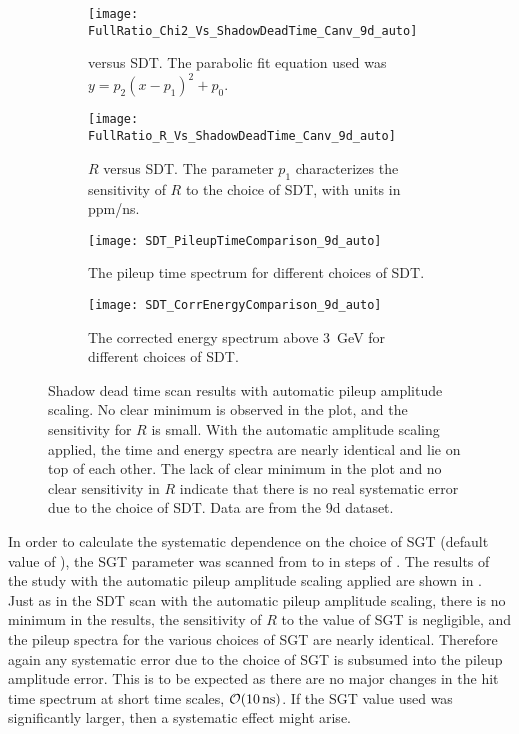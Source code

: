 \begin{figure}
\centering
    \begin{subfigure}[t]{0.45\textwidth}
        \centering
        \texttt{[image: FullRatio\_Chi2\_Vs\_ShadowDeadTime\_Canv\_9d\_auto]}
        \caption{\chisq versus SDT. The parabolic fit equation used was $y = p_{2}(x - p_{1})^{2} + p_{0}.$}
    \end{subfigure}%
    \hspace{1cm}
    \begin{subfigure}[t]{0.45\textwidth}
        \centering
        \texttt{[image: FullRatio\_R\_Vs\_ShadowDeadTime\_Canv\_9d\_auto]}
        \caption{$R$ versus SDT. The parameter $p_{1}$ characterizes the sensitivity of $R$ to the choice of SDT, with units in ppm/ns.}
    \end{subfigure}

    \begin{subfigure}[t]{0.45\textwidth}
        \centering
        \texttt{[image: SDT\_PileupTimeComparison\_9d\_auto]}
        \caption{The pileup time spectrum for different choices of SDT.}
    \end{subfigure}%
    \hspace{1cm}
    \begin{subfigure}[t]{0.45\textwidth}
        \centering
        \texttt{[image: SDT\_CorrEnergyComparison\_9d\_auto]}
        \caption{The corrected energy spectrum above \SI{3}{\GeV} for different choices of SDT.}
    \end{subfigure}
\caption[Pileup shadow dead time scan with automatic pileup amplitude scaling]{Shadow dead time scan results with automatic pileup amplitude scaling. No clear minimum is observed in the \chisq plot, and the sensitivity for $R$ is small. With the automatic amplitude scaling applied, the time and energy spectra are nearly identical and lie on top of each other. The lack of clear minimum in the \chisq plot and no clear sensitivity in $R$ indicate that there is no real systematic error due to the choice of SDT. Data are from the 9d dataset.}
\label{fig:SDTscan_autoScaling}
\end{figure}


In order to calculate the systematic dependence on the choice of SGT (default value of ), the SGT parameter was scanned from  to  in steps of . The results of the study with the automatic pileup amplitude scaling applied are shown in . Just as in the SDT scan with the automatic pileup amplitude scaling, there is no minimum in the \chisq results, the sensitivity of $R$ to the value of SGT is negligible, and the pileup spectra for the various choices of SGT are nearly identical. Therefore again any systematic error due to the choice of SGT is subsumed into the pileup amplitude error. This is to be expected as there are no major changes in the hit time spectrum at short time scales, $\mathcal{O}(\SI{10}{ns})$. If the SGT value used was significantly larger, then a systematic effect might arise. 


